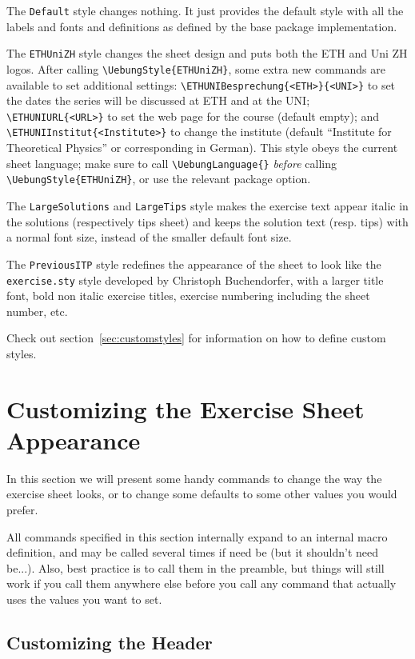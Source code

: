 \documentclass[11pt,a4paper]{article}
\begin{document}
The \texttt{Default} style changes nothing. It just provides the default style with all
the labels and fonts and definitions as defined by the base package implementation.

The \texttt{ETHUniZH} style changes the sheet design and puts both the ETH and Uni ZH
logos. After calling \verb|\UebungStyle{ETHUniZH}|, some extra new commands are available
to set additional settings: \verb|\ETHUNIBesprechung{<ETH>}{<UNI>}| to set the dates the
series will be discussed at ETH and at the UNI; \verb|\ETHUNIURL{<URL>}| to set the web
page for the course (default empty); and \verb|\ETHUNIInstitut{<Institute>}| to change the
institute (default ``Institute for Theoretical Physics'' or corresponding in German). This
style obeys the current sheet language; make sure to call \verb|\UebungLanguage{}|
\emph{before} calling \verb|\UebungStyle{ETHUniZH}|, or use the relevant package option.

The \texttt{LargeSolutions} and \texttt{LargeTips} style makes the exercise text appear
italic in the solutions (respectively tips sheet) and keeps the solution text (resp. tips)
with a normal font size, instead of the smaller default font size.

The \texttt{PreviousITP} style redefines the appearance of the sheet to look like the
\texttt{exercise.sty} style developed by Christoph Buchendorfer, with a larger title font,
bold non italic exercise titles, exercise numbering including the sheet number, etc.

Check out section~\ref{sec:customstyles} for information on how to define custom styles.

\section{Customizing the Exercise Sheet Appearance}
\label{sec:CustomizeSheet}

In this section we will present some handy commands to change the way the exercise sheet
looks, or to change some defaults to some other values you would prefer.

All  commands specified in this section internally expand to
an internal macro definition, and may be called several times if need be (but it shouldn't
need be...). Also, best practice is to call them in the preamble, but things will still
work if you call them anywhere else before you call any command that actually uses the
values you want to set.

\subsection{Customizing the Header}
\label{sec:CustomHeader}
\end{document}
